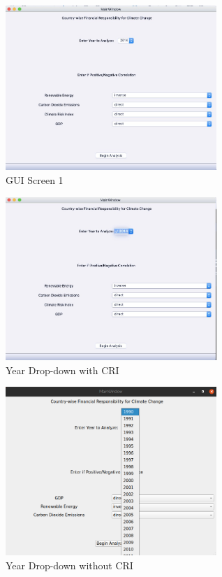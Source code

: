 \documentclass[fontsize=11pt]{article}
\begin{document}
    \begin{figure}[H]
        \centering
        \includegraphics[width=8cm]{Figure 1.jpeg}
        \caption{GUI Screen 1}
    \end{figure}
    \begin{figure}[H]
        \centering
        \includegraphics[width=8cm]{Figure 2.jpeg}
        \caption{Year Drop-down with CRI}
    \end{figure}
    \begin{figure}[H]
        \centering
        \includegraphics[width=8cm]{Figure 3.png}
        \caption{Year Drop-down without CRI}
    \end{figure}
\end{document}
